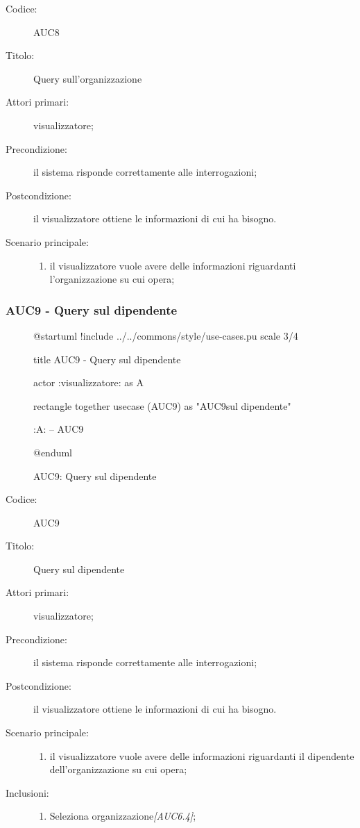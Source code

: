 \documentclass[casi-duso]{subfiles}
\begin{document}
\begin{description}
  \item[Codice:] AUC8
  \item[Titolo:] Query sull'organizzazione
  \item[Attori primari:] visualizzatore;
  \item[Precondizione:] il sistema risponde correttamente alle interrogazioni;
  \item[Postcondizione:] il visualizzatore ottiene le informazioni di cui ha bisogno.
  \item[Scenario principale:]
  \begin{enumerate}
    \item il visualizzatore vuole avere delle informazioni riguardanti l'organizzazione su cui opera;
  \end{enumerate}
\end{description}

\subsubsection{AUC9 - Query sul dipendente}%
\label{subsub:AUC9}

\begin{figure}[h!] 
  \centering 
  \begin{plantuml}
  @startuml
  !include ../../commons/style/use-cases.pu
  scale 3/4

  title AUC9 - Query sul dipendente

  actor :visualizzatore: as A

  rectangle {
    together {
      usecase (AUC9) as "AUC9\nQuery sul dipendente"
    }
  }

  :A: -- AUC9

  @enduml
  \end{plantuml} 
  \caption{AUC9: Query sul dipendente} 
  \label{fig:auc9} 
\end{figure}

\begin{description}
  \item[Codice:] AUC9
  \item[Titolo:] Query sul dipendente
  \item[Attori primari:] visualizzatore;
  \item[Precondizione:] il sistema risponde correttamente alle interrogazioni;
  \item[Postcondizione:] il visualizzatore ottiene le informazioni di cui ha bisogno.
  \item[Scenario principale:]
  \begin{enumerate}
    \item il visualizzatore vuole avere delle informazioni riguardanti il dipendente dell'organizzazione su cui opera;
  \end{enumerate}
  \item[Inclusioni:]
  \begin{enumerate}
    \item Seleziona organizzazione\emph{[AUC6.4]};
  \end{enumerate}
\end{description}
\end{document}
